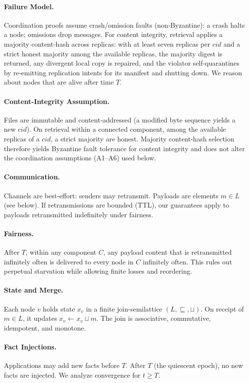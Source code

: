\documentclass[runningheads]{llncs}
\begin{document}
\paragraph{Failure Model.} Coordination proofs assume crash/omission faults (non‑Byzantine): a crash halts a node; omissions drop messages. For content integrity, retrieval applies a majority content‑hash across replicas: with at least seven replicas per $\mathit{cid}$ and a strict honest majority among the available replicas, the majority digest is returned, any divergent local copy is repaired, and the violator self‑quarantines by re‑emitting replication intents for its manifest and shutting down. We reason about nodes that are alive after time $T$.
\paragraph{Content‑Integrity Assumption.} Files are immutable and content‑addressed (a modified byte sequence yields a new $\mathit{cid}$). On retrieval within a connected component, among the available replicas of a $\mathit{cid}$, a strict majority are honest. Majority content‑hash selection therefore yields Byzantine fault tolerance for content integrity and does not alter the coordination assumptions (A1–A6) used below.
\paragraph{Communication.} Channels are best-effort: senders may retransmit. Payloads are elements $m\in L$ (see below). If retransmissions are bounded (TTL), our guarantees apply to payloads retransmitted indefinitely under fairness.
\paragraph{Fairness.} After $T$, within any component $C$, any payload content that is retransmitted infinitely often is delivered to every node in $C$ infinitely often. This rules out perpetual starvation while allowing finite losses and reordering.
\paragraph{State and Merge.} Each node $v$ holds state $x_v$ in a finite join-semilattice $(L,\sqsubseteq,\sqcup)$. On receipt of $m\in L$, it updates $x_v\gets x_v\sqcup m$. The join is associative, commutative, idempotent, and monotone.
\paragraph{Fact Injections.} Applications may add new facts before $T$. After $T$ (the quiescent epoch), no new facts are injected. We analyze convergence for $t\ge T$.
\end{document}
